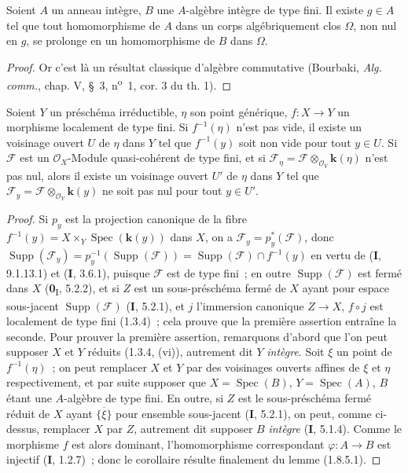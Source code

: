 \begin{lemma}[1.8.5.1]
\label{IV.1.8.5.1-fr}
Soient $A$ un anneau intègre, $B$ une $A$-algèbre intègre de type fini. Il
existe $g\in A$ tel que tout homomorphisme de $A$ dans un corps
algébriquement clos $\Omega$, non nul en $g$, se prolonge en un homomorphisme
de $B$ dans $\Omega$.
\end{lemma}

\begin{proof}
Or c'est là un résultat classique d'algèbre commutative (Bourbaki,
\emph{Alg. comm.}, chap. V, \S~3, n\textsuperscript{o}~1, cor. 3 du th. 1).
\end{proof}

\begin{corollary}[1.8.6]
\label{IV.1.8.6-fr}
Soient $Y$ un préschéma irréductible, $\eta$ son point générique,
$f:X\to Y$ un morphisme localement de type fini. Si $f^{-1}(\eta)$ n'est pas
vide, il existe un voisinage ouvert $U$ de $\eta$ dans $Y$ tel que
$f^{-1}(y)$ soit non vide pour tout $y\in U$. Si $\mathscr F$ est un
$\mathcal O_X$-Module quasi-cohérent de type fini, et si
$\mathscr F_\eta=\mathscr F\otimes_{\mathcal O_Y}\boldsymbol{k}(\eta)$ n'est pas nul,
alors il existe un voisinage ouvert $U'$ de $\eta$ dans $Y$ tel que
$\mathscr F_y=\mathscr F\otimes_{\mathcal O_Y}\boldsymbol{k}(y)$ ne soit pas nul pour
tout $y\in U'$.
\end{corollary}

\begin{proof}
Si $p_y$ est la projection canonique de la fibre
$f^{-1}(y)=X\times_Y\operatorname{Spec}(\boldsymbol{k}(y))$ dans $X$, on a
$\mathscr F_y=p_y^*(\mathscr F)$, donc
$\operatorname{Supp}(\mathscr F_y)=p_y^{-1}(\operatorname{Supp}(\mathscr F))
=\operatorname{Supp}(\mathscr F)\cap f^{-1}(y)$ en vertu de (\textbf{I}, 9.1.13.1) et
(\textbf{I}, 3.6.1), puisque $\mathscr F$ est de type fini~; en outre
$\operatorname{Supp}(\mathscr F)$ est fermé dans $X$ (\textbf{0}\textsubscript{I},
5.2.2), et si $Z$ est un sous-préschéma fermé de $X$ ayant pour espace
sous-jacent $\operatorname{Supp}(\mathscr F)$ (\textbf{I}, 5.2.1), et $j$ l'immersion
canonique $Z\to X$, $f\circ j$ est localement de type fini (1.3.4)~; cela
prouve que la première assertion entraîne la seconde. Pour prouver la
première assertion, remarquons d'abord que l'on peut supposer $X$ et $Y$
réduits (1.3.4, (vi)), autrement dit $Y$ \emph{intègre}. Soit $\xi$ un point de
$f^{-1}(\eta)$~; on peut remplacer $X$ et $Y$ par des voisinages ouverts
affines de $\xi$ et $\eta$ respectivement, et par suite supposer que
$X=\operatorname{Spec}(B)$, $Y=\operatorname{Spec}(A)$, $B$ étant une
$A$-algèbre de type fini. En outre, si $Z$ est le sous-préschéma fermé réduit
de $X$ ayant $\overline{\{\xi\}}$ pour ensemble sous-jacent (\textbf{I}, 5.2.1), on
peut, comme ci-dessus, remplacer $X$ par $Z$, autrement dit supposer $B$
\emph{intègre} (\textbf{I}, 5.1.4). Comme le morphisme $f$ est alors dominant,
l'homomorphisme correspondant $\varphi:A\to B$ est injectif (\textbf{I}, 1.2.7)~;
donc le corollaire résulte finalement du lemme (1.8.5.1).
\end{proof}

